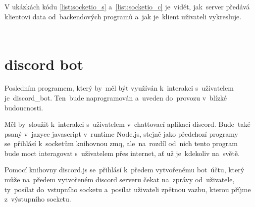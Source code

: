 V ukázkách kódu \ref{list:socketio_s}  a~\ref{list:socketio_c} je~vidět,  jak~server předává klientovi data od~backendových programů  a~jak je~klient uživateli vykresluje.
\begin{code}
    \inputminted[frame=lines,fontsize=\footnotesize{}, linenos, breaklines]{js}{code_examples/socketio_server.js}
\end{code}
\begin{code}
    \inputminted[frame=lines,fontsize=\footnotesize{}, linenos, breaklines]{js}{code_examples/socketio_client.js}
\end{code}



\section{discord bot}

Posledním programem, který by~měl být využíván k~interakci s~uživatelem je~discord\_bot.  Ten~bude naprogramován  a~uveden do~provozu  v~blízké budoucnosti.

Měl by~sloužit  k~interakci  s~uživatelem  v~chattovací aplikaci discord. Bude~také psaný v~jazyce javascript v~runtime Node.js, stejně jako předchozí programy se~přihlásí k~socketům knihovnou zmq,  ale~na~rozdíl od~nich tento program bude moct interagovat s~uživatelem přes internet, ať už je~kdekoliv na~světě.

Pomocí knihovny discord.js se~přihlásí k~předem vytvořenému  bot~účtu, který může na~předem vytvořeném discord serveru čekat na~zprávy od~uživatele, ty~posílat do~vstupního socketu a~posílat uživateli zpětnou vazbu, kterou příjme z~výstupního socketu.
